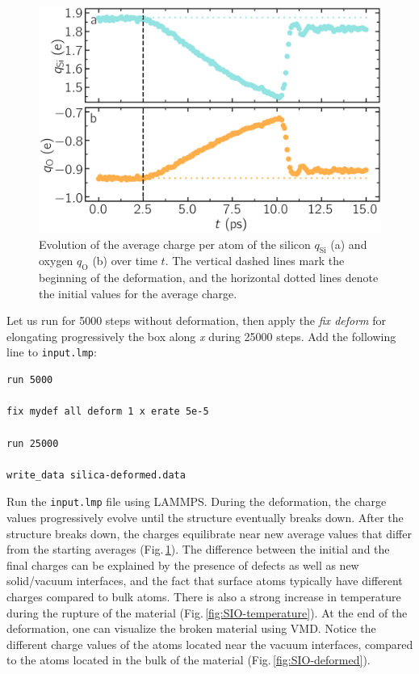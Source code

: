\documentclass[9pt,tutorial]{livecoms}
\newcommand{\flecmd}[1]{\textcolor{command}{\texttt{#1}}} %
\begin{document}
\begin{figure}
\includegraphics[width=\linewidth]{SIO-deformed-charge}
\caption{Evolution of the average charge per atom of the silicon $q_\text{Si}$
(a) and oxygen $q_\text{O}$ (b) over time $t$. The vertical dashed lines mark
the beginning of the deformation, and the horizontal dotted lines denote the
initial values for the average charge.}
\label{fig:SIO-deformed-charge}
\end{figure}

Let us run for 5000 steps without deformation, then apply the \textit{fix deform}
for elongating progressively the box along \textit{x} during 25000 steps. Add
the following line to \flecmd{input.lmp}:
\begin{lstlisting}
run 5000

fix mydef all deform 1 x erate 5e-5

run 25000

write_data silica-deformed.data
\end{lstlisting}
Run the \flecmd{input.lmp} file using LAMMPS. During the deformation, the charge
values progressively evolve until the structure eventually breaks down. After the
structure breaks down, the charges equilibrate near new average values that differ
from the starting averages (Fig.\,\ref{fig:SIO-deformed-charge}). The difference
between the initial and the final charges can be explained by the presence of
defects as well as new solid/vacuum interfaces, and the fact that surface atoms
typically have different charges compared to bulk atoms. There is also a strong
increase in temperature during the rupture of the material (Fig.\,\ref{fig:SIO-temperature}).
At the end of the deformation, one can visualize the broken material using VMD.
Notice the different charge values of the atoms located near the vacuum interfaces,
compared to the atoms located in the bulk of the material (Fig.\,\ref{fig:SIO-deformed}).
\end{document}
